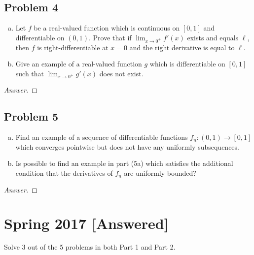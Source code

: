 \documentclass[12pt]{article}
\theoremstyle{definition}
\begin{document}
\subsection{Problem 4}
\begin{enumerate}[(a)]
    \item Let $f$ be a real-valued function which is continuous on $[0,1]$ and differentiable on $(0,1)$. Prove that if $\lim_{x \to 0^+} f'(x)$ exists and equals $\ell$, then $f$ is right-differentiable at $x = 0$  and the right derivative is equal to $\ell$.
    \item Give an example of a real-valued function $g$ which is differentiable on $[0,1]$ such that $\lim_{x \to 0^+} g'(x)$ does not exist. 
\end{enumerate}
\begin{proof}[Answer]
    
\end{proof}

\subsection{Problem 5}
\begin{enumerate}[(a)]
    \item Find an example of a sequence of differentiable functions $f_n : (0,1) \to [0,1]$ which converges pointwise but does not have any uniformly subsequences. 
    \item Is possible to find an example in part (5a) which satisfies the additional condition that the derivatives of $f_n$ are uniformly bounded?
\end{enumerate}
\begin{proof}[Answer]
    
\end{proof}

\newpage
\section{Spring 2017 [Answered]}
Solve 3 out of the 5 problems in both Part 1 and Part 2. 
\end{document}
